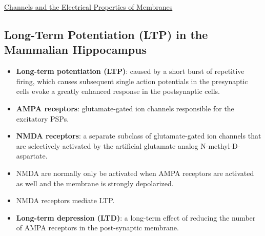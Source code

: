 \documentclass[12pt,letterpaper]{article}
\begin{document}
\begin{secbox}{\hyperlink{11}{Channels and the Electrical Properties of Membranes}}
{    \hypertarget{11.3.18}{\subsection*{Long-Term Potentiation (LTP) in the Mammalian Hippocampus}}
    \begin{itemize}
        \item \textbf{Long-term potentiation (LTP)}: caused by a short burst of repetitive firing, which causes subsequent single action potentials in the presynaptic cells evoke a greatly enhanced response in the postsynaptic cells.
        \item \textbf{AMPA receptors}: glutamate-gated ion channels responsible for the excitatory PSPs.
        \item \textbf{NMDA receptors}: a separate subclass of glutamate-gated ion channels that are selectively activated by the artificial glutamate analog N-methyl-D-aspartate. 
        \item NMDA are normally only be activated when AMPA receptors are activated as well and the membrane is strongly depolarized. 
        \item NMDA receptors mediate LTP.
        \item \textbf{Long-term depression (LTD)}: a long-term effect of reducing the number of AMPA receptors in the post-synaptic membrane.
    \end{itemize}
    
}
\end{secbox}
\end{document}
